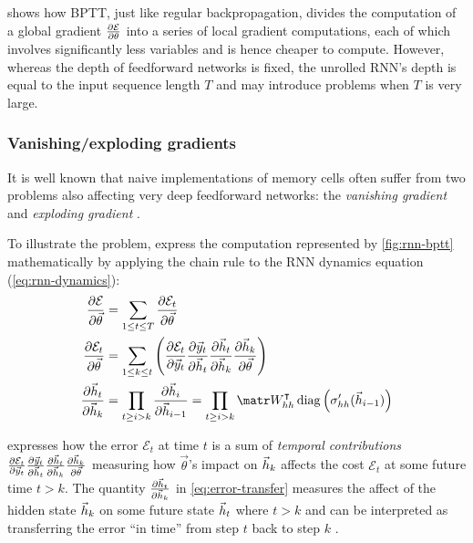  shows how BPTT, just like regular backpropagation, divides
the computation of a global gradient $\frac{\partial \mathcal{E}}{\partial \theta}$ into
a series of local gradient computations, each of which involves significantly
less variables and is hence cheaper to compute. However, whereas the depth of
feedforward networks is fixed, the unrolled RNN's depth is equal to the input
sequence length $T$ and may introduce problems when $T$ is very large.

\subsubsection{Vanishing/exploding gradients}

It is well known that naive implementations of memory cells often suffer from
two problems also affecting very deep feedforward networks: the \emph{vanishing
gradient} and \emph{exploding gradient} \citep{Bengio1994}.

To illustrate the problem, express the computation represented by
\cref{fig:rnn-bptt} mathematically by applying the chain rule to
the RNN dynamics equation (\vref{eq:rnn-dynamics}):
\begin{align}
  \frac{\pd \mathcal{E}}{\pd \vec{\theta}} &= \sum_{1 \leq t \leq T} \frac{\pd \mathcal{E}_t}{\pd \vec{\theta}} \label{eq:err-total}\\
    \frac{\pd \mathcal{E}_t}{\pd \vec{\theta}} &= \sum_{1 \leq k \leq t} \left(
        \frac{\pd \mathcal{E}_t}{\pd \y_t}
        \frac{\pd \y_t}{\pd \h_t}
        \frac{\pd \h_t}{\pd \h_k}
        \frac{\pd \h_k}{\pd \vec{\theta}}
    \right) \label{eq:error-t}\\
    \frac{\pd \h_t}{\pd \h_k} &=
    \prod_{t \geq i > k} \frac{\pd \h_i}{\pd \h_{i-1}}
    = \prod_{t \geq i > k} \W_{hh}^\tp \diag \left( \sigma_{hh}'( \h_{i-1} ) \right)
    \label{eq:error-transfer}
\end{align}

 expresses how the error $\mathcal{E}_t$ at time $t$ is a sum
of \emph{temporal contributions} $
\frac{\partial \mathcal{E}_t}{\partial \vec{y}_t}
\frac{\partial \vec{y}_t}{\partial \vec{h}_t}
\frac{\partial \vec{h}_t}{\partial \vec{h}_k}
\frac{\partial \vec{h}_k}{\partial \vec{\theta}}$
measuring how $\vec{\theta}$'s impact on $\vec{h}_k$ affects the cost
$\mathcal{E}_t$ at some future time $t > k$. The quantity
$\frac{\partial \vec{h}_t}{\partial \vec{h}_k}$ in \cref{eq:error-transfer} measures the affect of
the hidden state $\vec{h}_k$ on some future state $\vec{h}_t$ where $t > k$ and can be
interpreted as transferring the error ``in time'' from step $t$ back to step
$k$ \citep{Pascanu2012}.


